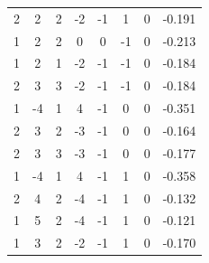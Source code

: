 \documentclass[a4paper, 12pt]{article}
\begin{document}
\begin{table}[H]
\begin{tabular}{@{}cccccccc@{}}
    2                      & 2                      & 2                      & -2                     & -1                & 1                 & 0                 & -0.191              \\
    1                      & 2                      & 2                      & 0                      & 0                 & -1                & 0                 & -0.213              \\
    1                      & 2                      & 1                      & -2                     & -1                & -1                & 0                 & -0.184              \\
    2                      & 3                      & 3                      & -2                     & -1                & -1                & 0                 & -0.184              \\
    1                      & -4                     & 1                      & 4                      & -1                & 0                 & 0                 & -0.351              \\
    2                      & 3                      & 2                      & -3                     & -1                & 0                 & 0                 & -0.164              \\
    2                      & 3                      & 3                      & -3                     & -1                & 0                 & 0                 & -0.177              \\
    1                      & -4                     & 1                      & 4                      & -1                & 1                 & 0                 & -0.358              \\
    2                      & 4                      & 2                      & -4                     & -1                & 1                 & 0                 & -0.132              \\
    1                      & 5                      & 2                      & -4                     & -1                & 1                 & 0                 & -0.121              \\
    1                      & 3                      & 2                      & -2                     & -1                & 1                 & 0                 & -0.170              \\ \bottomrule
    \end{tabular}
    \end{table}


   
\end{document}
